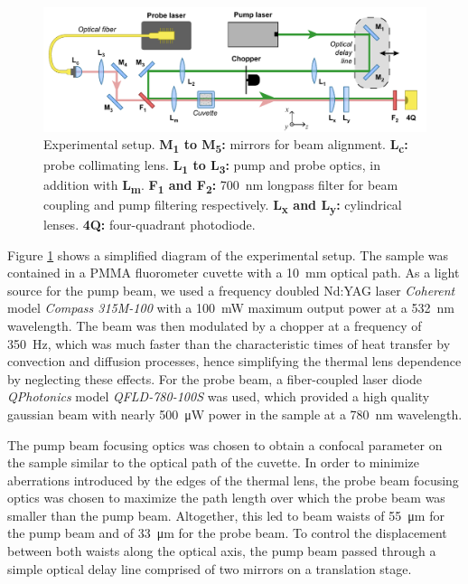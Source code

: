 \documentclass[9pt,twocolumn,twoside]{osajnl}
\newcommand{\low}[1]{\textsubscript{#1}}
\begin{document}
\begin{figure}[ht]
	\centering \includegraphics[width=\textwidth]{figures/Setup.pdf}
	\caption{Experimental setup. \textbf{M\low{1} to M\low{5}:} mirrors for beam alignment. \textbf{L\low{c}:} probe collimating lens. \textbf{L\low{1} to L\low{3}:} pump and probe optics, in addition with \textbf{L\low{m}}. \textbf{F\low{1} and F\low{2}:} \SI{700}{\nano\metre} longpass filter for beam coupling and pump filtering respectively. \textbf{L\low{x} and L\low{y}:} cylindrical lenses. \textbf{4Q:} four-quadrant photodiode.}
	\label{fig:Experimental}
\end{figure}

Figure \ref{fig:Experimental} shows a simplified diagram of the experimental setup. The sample was contained in a PMMA fluorometer cuvette with a \SI{10}{\milli\metre} optical path. As a light source for the pump beam, we used a frequency doubled Nd:YAG laser \emph{Coherent} model \emph{Compass 315M-100} with a \SI{100}{\milli\watt} maximum output power at a \SI{532}{\nano\metre} wavelength. The beam was then modulated by a chopper at a frequency of \SI{350}{\hertz}, which was much faster than the characteristic times of heat transfer by convection and diffusion processes, hence simplifying the thermal lens dependence by neglecting these effects. For the probe beam, a fiber-coupled laser diode \emph{QPhotonics} model \emph{QFLD-780-100S} was used, which provided a high quality gaussian beam with nearly \SI{500}{\micro\watt} power in the sample at a \SI{780}{\nano\metre} wavelength.

The pump beam focusing optics was chosen to obtain a confocal parameter on the sample similar to the optical path of the cuvette. In order to minimize aberrations introduced by the edges of the thermal lens, the probe beam focusing optics was chosen to maximize the path length over which the probe beam was smaller than the pump beam. Altogether, this led to beam waists of \SI{55}{\micro\metre} for the pump beam and of \SI{33}{\micro\metre} for the probe beam. To control the displacement between both waists along the optical axis, the pump beam passed through a simple optical delay line comprised of two mirrors on a translation stage.
\end{document}

